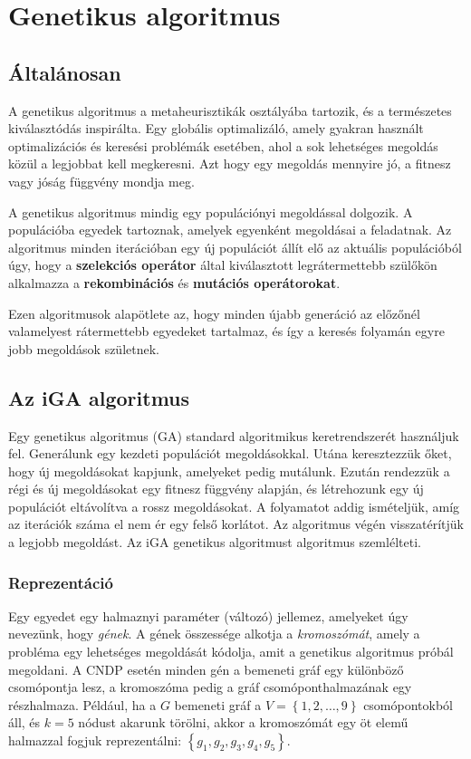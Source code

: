 \section{Genetikus algoritmus}\label{sec:GENETIKUS_ALGORITMUS}


\subsection{Általánosan}
A genetikus algoritmus a metaheurisztikák osztályába tartozik, és a természetes kiválasztódás inspirálta.
Egy globális optimalizáló, amely gyakran használt optimalizációs és keresési problémák esetében,
ahol a sok lehetséges megoldás közül a legjobbat kell megkeresni.
Azt hogy egy megoldás mennyire jó, a fitnesz vagy jóság függvény mondja meg.

A genetikus algoritmus mindig egy populációnyi megoldással dolgozik.
A populációba egyedek tartoznak, amelyek egyenként megoldásai a feladatnak.
Az algoritmus minden iterációban egy új populációt állít elő az aktuális populációból úgy,
hogy a \textbf{szelekciós operátor} által kiválasztott legrátermettebb szülőkön alkalmazza a
\textbf{rekombinációs} és \textbf{mutációs operátorokat}.

Ezen algoritmusok alapötlete az, hogy minden újabb generáció
az előzőnél valamelyest rátermettebb egyedeket tartalmaz, és így a keresés folyamán
egyre jobb megoldások születnek.


\subsection{Az iGA algoritmus}
Egy genetikus algoritmus (GA) standard algoritmikus keretrendszerét használjuk fel.
Generálunk egy kezdeti populációt megoldásokkal. Utána keresztezzük őket, hogy új megoldásokat kapjunk,
amelyeket pedig mutálunk. Ezután rendezzük a régi és új megoldásokat egy fitnesz függvény alapján,
és létrehozunk egy új populációt eltávolítva a rossz megoldásokat.
A folyamatot addig ismételjük, amíg az iterációk száma el nem ér egy felső korlátot.
Az algoritmus végén visszatérítjük a legjobb megoldást.
Az iGA genetikus algoritmust  algoritmus szemlélteti.



\subsubsection{Reprezentáció}
Egy egyedet egy halmaznyi paraméter (változó) jellemez, amelyeket úgy nevezünk, hogy \textit{gének}.
A gének összessége alkotja a \textit{kromoszómát}, amely a probléma egy lehetséges megoldását kódolja, amit a genetikus algoritmus próbál megoldani.
A CNDP esetén minden gén a bemeneti gráf egy különböző csomópontja lesz, a kromoszóma pedig a gráf csomóponthalmazának egy részhalmaza.
Például, ha a $G$ bemeneti gráf a $V = \left\{ 1, 2, \dotsc, 9 \right\}$ csomópontokból áll, és $k = 5$ nódust akarunk törölni,
akkor a kromoszómát egy öt elemű halmazzal fogjuk reprezentálni: $\left\{g_1,g_2,g_3,g_4,g_5\right\}$.


